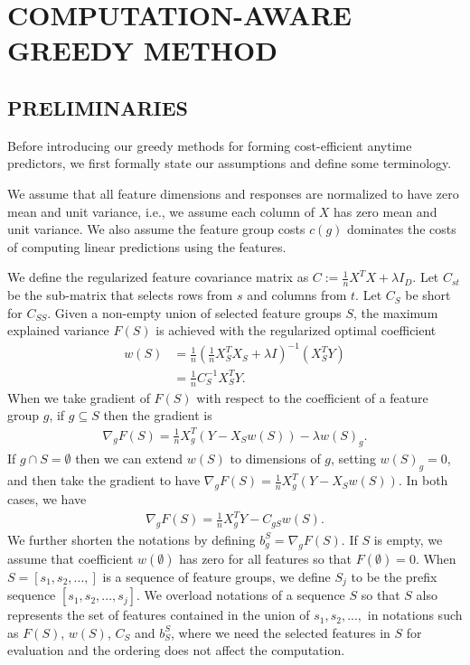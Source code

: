 \section{COMPUTATION-AWARE GREEDY METHOD}
\label{sec:gomp_method}


\subsection{PRELIMINARIES}
Before introducing our greedy methods for forming cost-efficient anytime predictors, 
we first formally state our assumptions and define some terminology.

We assume that all feature dimensions and responses are normalized to 
have zero mean and unit variance, i.e., we assume each column of $X$ has zero mean and unit variance.
We also assume the feature group costs $c(g)$ dominates the costs of computing linear predictions 
using the features.

We define the regularized feature covariance matrix as 
$C := \frac{1}{n}X^TX + \lambda I_D$. 
Let $C_{st}$ be the sub-matrix that selects rows from $s$ and columns from $t$. Let $C_S$ be short for $C_{SS}$. 
Given a non-empty union of selected feature groups $S$, the maximum explained variance 
$F(S)$ is achieved with the regularized optimal 
coefficient 
\begin{align}
w(S) 
&= \frac{1}{n}(\frac{1}{n}X_S^TX_S + \lambda I)^{-1}(X_S^TY) \\
&= \frac{1}{n} C_S^{-1}X_S^TY.
\label{eq:gomp_w}
\end{align}
When we take gradient of $F(S)$ with respect to the coefficient 
of a feature group $g$, if $g \subseteq S$ then the gradient is
\begin{align}
\nabla_g F(S) = \frac{1}{n} X_g^T(Y-X_Sw(S)) - \lambda w(S)_g.
\label{eq:gomp_g}
\end{align}
If $g \cap S  =\emptyset$ then we can extend $w(S)$ to dimensions of $g$, setting $w(S)_g = 0$, and then take the gradient to have 
\mbox{$\nabla_g F(S) =\frac{1}{n} X_g^T(Y-X_Sw(S))$}. In both cases,
we have 
\begin{align}
\nabla_g F(S) = \frac{1}{n} X_g^TY - C_{gS}w(S).
\label{eq:gomp_g}
\end{align} 
We further shorten the notations by defining $b_g^{S} = \nabla _g F(S)$. 
If $S$ is empty, we assume that coefficient $w(\emptyset)$ has zero for all features so that $F(\emptyset) = 0$. 
When $S = [s_1, s_2,...,]$ is a sequence of feature groups, we define
$S_j$ to be the prefix sequence $[s_1, s_2,..., s_j]$. We 
overload notations of a sequence $S$ so that $S$ also represents 
the set of features contained in the union of $s_1, s_2, ...,$ in notations such as $F(S)$, $w(S)$, $C_S$ and $b_S^S$, 
where we need the selected features in $S$ for evaluation and the ordering does not affect the computation.

